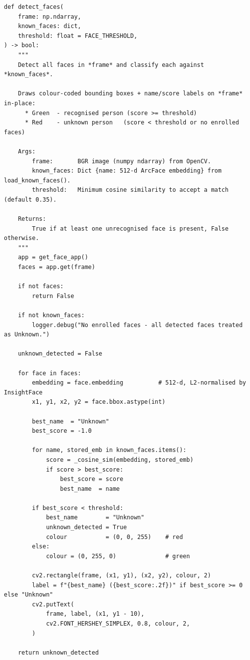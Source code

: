 \documentclass[12pt,a4paper]{report}
\begin{document}
\begin{lstlisting}
def detect_faces(
    frame: np.ndarray,
    known_faces: dict,
    threshold: float = FACE_THRESHOLD,
) -> bool:
    """
    Detect all faces in *frame* and classify each against *known_faces*.

    Draws colour-coded bounding boxes + name/score labels on *frame* in-place:
      * Green  - recognised person (score >= threshold)
      * Red    - unknown person   (score < threshold or no enrolled faces)

    Args:
        frame:       BGR image (numpy ndarray) from OpenCV.
        known_faces: Dict {name: 512-d ArcFace embedding} from load_known_faces().
        threshold:   Minimum cosine similarity to accept a match (default 0.35).

    Returns:
        True if at least one unrecognised face is present, False otherwise.
    """
    app = get_face_app()
    faces = app.get(frame)

    if not faces:
        return False

    if not known_faces:
        logger.debug("No enrolled faces - all detected faces treated as Unknown.")

    unknown_detected = False

    for face in faces:
        embedding = face.embedding          # 512-d, L2-normalised by InsightFace
        x1, y1, x2, y2 = face.bbox.astype(int)

        best_name  = "Unknown"
        best_score = -1.0

        for name, stored_emb in known_faces.items():
            score = _cosine_sim(embedding, stored_emb)
            if score > best_score:
                best_score = score
                best_name  = name

        if best_score < threshold:
            best_name        = "Unknown"
            unknown_detected = True
            colour           = (0, 0, 255)    # red
        else:
            colour = (0, 255, 0)              # green

        cv2.rectangle(frame, (x1, y1), (x2, y2), colour, 2)
        label = f"{best_name} ({best_score:.2f})" if best_score >= 0 else "Unknown"
        cv2.putText(
            frame, label, (x1, y1 - 10),
            cv2.FONT_HERSHEY_SIMPLEX, 0.8, colour, 2,
        )

    return unknown_detected
\end{lstlisting}

\end{document}
